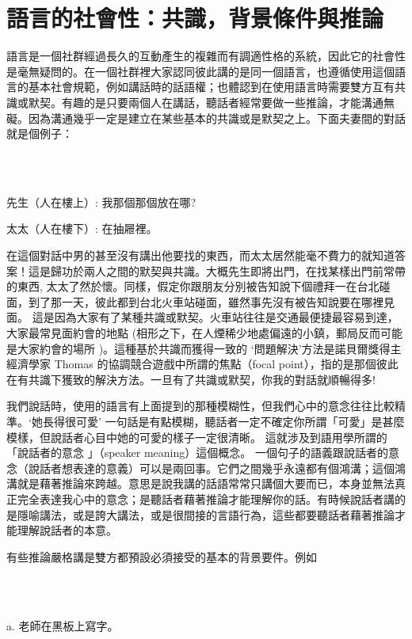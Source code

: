 \section{語言的社會性：共識，背景條件與推論}  %

語言是一個社群經過長久的互動產生的複雜而有調適性格的系統，因此它的社會性是毫無疑問的。在一個社群裡大家認同彼此講的是同一個語言，也遵循使用這個語言的基本社會規範，例如講話時的話語權；也體認到在使用語言時需要雙方互有共識或默契。有趣的是只要兩個人在講話，聽話者經常要做一些推論，才能溝通無礙。因為溝通幾乎一定是建立在某些基本的共識或是默契之上。下面夫妻間的對話就是個例子：

\ea%
\label{ex:key:12}
\gll\\
\\
\glt
\z

先生（人在樓上）: 我那個那個放在哪?

太太（人在樓下）:  在抽屜裡。

在這個對話中男的甚至沒有講出他要找的東西，而太太居然能毫不費力的就知道答案！這是歸功於兩人之間的默契與共識。大概先生即將出門，在找某樣出門前常帶的東西, 太太了然於懷。同樣，假定你跟朋友分別被告知說下個禮拜一在台北碰面，到了那一天，彼此都到台北火車站碰面，雖然事先沒有被告知說要在哪裡見面。 這是因為大家有了某種共識或默契。火車站往往是交通最便捷最容易到達，大家最常見面約會的地點 (相形之下，在人煙稀少地處偏遠的小鎮，郵局反而可能是大家約會的場所 )。這種基於共識而獲得一致的 ‘問題解決’方法是諾貝爾獎得主經濟學家 Thomas \citet{Schelling1960} 的協調競合遊戲中所謂的焦點（focal point），指的是那個彼此在有共識下獲致的解決方法。一旦有了共識或默契，你我的對話就順暢得多!

我們說話時，使用的語言有上面提到的那種模糊性，但我們心中的意念往往比較精準。‘她長得很可愛' 一句話是有點模糊，聽話者一定不確定你所謂「可愛」是甚麼模樣，但說話者心目中她的可愛的樣子一定很清晰。 這就涉及到語用學所謂的「說話者的意念 」（speaker meaning）這個概念。 一個句子的語義跟說話者的意念（說話者想表達的意義）可以是兩回事。它們之間幾乎永遠都有個鴻溝；這個鴻溝就是藉著推論來跨越。意思是說我講的話語常常只講個大要而已，本身並無法真正完全表達我心中的意念；是聽話者藉著推論才能理解你的話。有時候說話者講的是隱喻講法，或是誇大講法，或是很間接的言語行為，這些都要聽話者藉著推論才能理解說話者的本意。

有些推論嚴格講是雙方都預設必須接受的基本的背景要件。例如

\ea%
\label{ex:key:13}
\gll\\
\\
\glt
\z

a.  老師在黑板上寫字。


